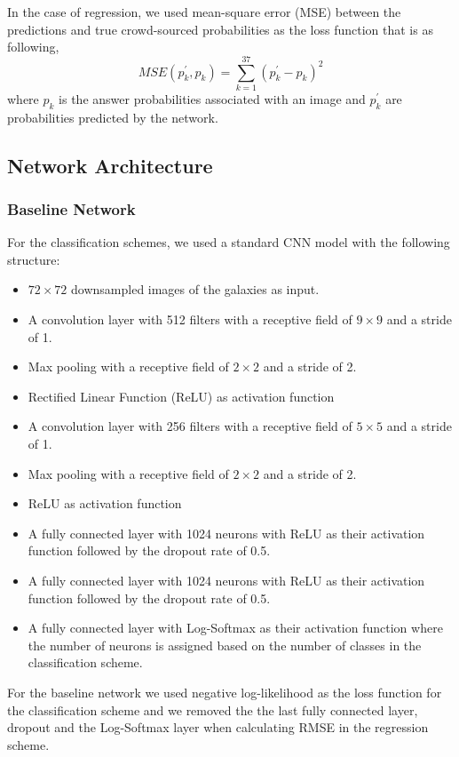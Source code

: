 \documentclass[a4paper,fleqn,usenatbib]{mnras}
\begin{document}
In the case of regression, we used mean-square error (MSE) between the predictions and true crowd-sourced probabilities as the loss function that is as following,
\begin{equation}
MSE(p_{k}^{\prime} , p_{k})  = \sum_{k=1}^{37} (p_{k}^{\prime}  - p_{k})^{2}
\end{equation}
where $p_{k}$ is the answer probabilities associated with an image and $p_{k}^{\prime}$ are probabilities predicted by the network.

\subsection{Network Architecture}\label{arc}
\subsubsection{Baseline Network}
For the classification schemes, we used a standard CNN model with the following structure:
\begin{itemize}
	 \item $72 \times 72$ downsampled images of the galaxies as input.
	 \item A convolution layer with 512 filters with a receptive field of $9\times9$ and a stride of 1.
 	\item Max pooling with a receptive field of $2\times2$ and a stride of 2.
 	\item Rectified Linear Function (ReLU) \citep{glorot2011deep, nair2010rectified} as activation function
 	\item A convolution layer with 256 filters with a receptive field of $5\times5$ and a stride of 1.
 	\item Max pooling with a receptive field of $2\times2$ and a stride of 2.
 	\item ReLU as activation function
 	\item A fully connected layer with 1024 neurons with ReLU as their activation function followed by the dropout rate of 0.5.
 	\item A fully connected layer with 1024 neurons with ReLU as their activation function followed by the dropout rate of 0.5.
 	\item A fully connected layer with Log-Softmax as their activation function where the number of neurons is assigned based on the number of classes in the classification scheme.
\end{itemize}

For the baseline network we used negative log-likelihood as the loss function for the classification scheme and we removed the the last fully connected layer, dropout and the Log-Softmax layer when calculating RMSE in the regression scheme. 
\end{document}
